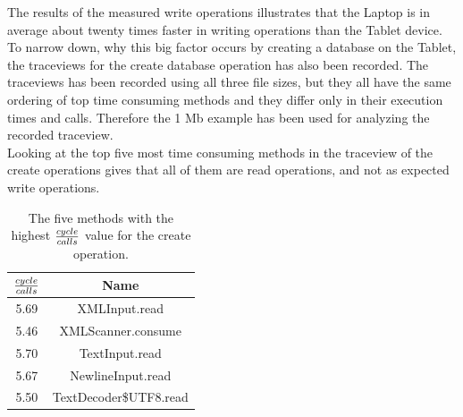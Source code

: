 The results of the measured write operations illustrates that the Laptop is in average about twenty times faster in writing operations than the Tablet device.
To narrow down, why this big factor occurs by creating a database on the Tablet, the traceviews for the create database operation has also been recorded.
The traceviews has been recorded using all three file sizes, but they all have the same ordering of top time consuming methods and they differ only in their execution times and calls.
Therefore the 1 Mb example has been used for analyzing the recorded traceview.\\
Looking at the top five most time consuming methods in the traceview of the create operations gives that all of them are read operations, and not as expected write operations.

\begin{table}[htpb]
	\centering
	\begin{tabular}{|c|c|}
		\hline
		${cycle \over calls}$&Name\\
		\hline
		5.69&XMLInput.read\\
		\hline
		5.46&XMLScanner.consume\\
		\hline
		5.70&TextInput.read\\
		\hline
		5.67&NewlineInput.read\\
		\hline
		5.50&TextDecoder\$UTF8.read\\
		\hline
	\end{tabular}
	\caption{The five methods with the highest ${cycle \over calls}$ value for the create operation.}
	\label{tab:top-five-cycle-call-write}
\end{table}

